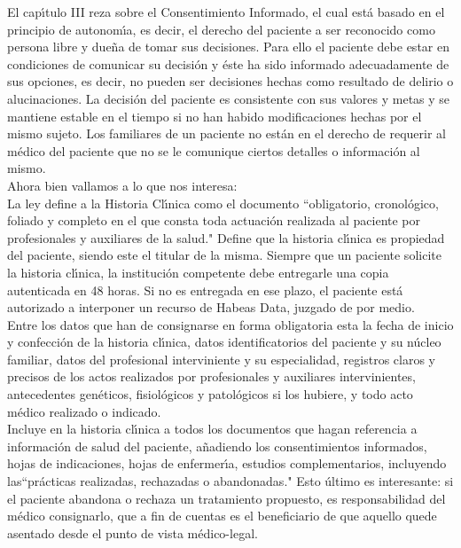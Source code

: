 El cap\'{\i}tulo III reza sobre el Consentimiento Informado, el cual est\'a basado en 
el principio de autonom\'{\i}a, es decir, el derecho del paciente a ser reconocido 
como persona libre y due\~na de tomar sus decisiones. Para ello el paciente debe estar en 
condiciones de comunicar su decisi\'on y  \'este ha sido informado adecuadamente de 
sus opciones, es decir, no pueden ser decisiones hechas como resultado de delirio 
o alucinaciones. La decisi\'on del paciente es consistente con sus valores y metas 
y se mantiene estable en el tiempo si no han habido modificaciones hechas por
el mismo sujeto. Los familiares de un paciente no est\'an en el derecho de 
requerir al m\'edico del paciente que no se le comunique ciertos detalles o
informaci\'on al mismo. \\[0.1cm]

Ahora bien vallamos a lo que nos interesa:\\[0.1cm]

La ley define a la Historia Cl\'{\i}nica como el documento ``obligatorio, cronol\'ogico,
foliado y completo en el que consta toda actuaci\'on realizada al paciente por
profesionales y auxiliares de la salud." Define que la historia cl\'{\i}nica es 
propiedad del paciente, siendo este el titular de la misma. Siempre que un paciente 
solicite la historia cl\'{\i}nica, la instituci\'on competente debe entregarle una copia
autenticada en 48 horas. Si no es entregada en ese plazo, el
paciente est\'a autorizado a interponer un recurso de Habeas Data, juzgado de por 
medio. \\[0.1cm]

Entre los datos que han de consignarse en forma obligatoria esta la fecha de 
inicio y confecci\'on de la historia cl\'{\i}nica, datos identificatorios del paciente
y su n\'ucleo familiar, datos del profesional interviniente y su especialidad, 
registros claros y precisos de los actos realizados por profesionales y auxiliares
intervinientes, antecedentes gen\'eticos, fisiol\'ogicos y patol\'ogicos si los hubiere,
y todo acto m\'edico realizado o indicado.\\[0.1cm]

Incluye en la historia cl\'{\i}nica a todos los documentos que hagan referencia a 
informaci\'on de salud del paciente, a\~nadiendo los consentimientos informados, 
hojas de indicaciones, hojas de enfermer\'{\i}a, estudios complementarios, 
incluyendo las``pr\'acticas realizadas, rechazadas o abandonadas." 
Esto  \'ultimo es interesante: si el paciente abandona o rechaza un tratamiento 
propuesto, es responsabilidad del m\'edico consignarlo, que a fin de cuentas es el
beneficiario de que aquello quede asentado desde el punto de vista m\'edico-legal.\\[0.1cm]

